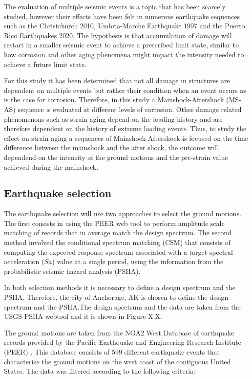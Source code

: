 The evaluation of multiple seismic events is a topic that has been scarcely studied, however their effects have been felt in numerous earthquake sequences such as the Christchurch 2010, Umbria-Marche Earthquake 1997 and the Puerto Rico Earthquakes 2020. The hypothesis is that accumulation of damage will restart in a smaller seismic event to achieve a prescribed limit state, similar to how corrosion and other aging phenomena might impact the intensity needed to achieve a future limit state. 

For this study it has been determined that not all damage in structures are dependent on multiple events but rather their condition when an event occurs as is the case for corrosion. Therefore, in this study a Mainshock-Aftershock (MS-AS) sequence is evaluated at different levels of corrosion. Other damage related phenomenons such as strain aging depend on the loading history and are therefore dependent on the history of extreme loading events. Thus, to study the effect on strain aging a sequences of Mainshock-Aftershock is focused on the time difference between the mainshock and the after shock, the outcome will dependend on the intensity of the ground motions and the pre-strain value achieved during the mainshock.

\subsection{Earthquake selection}

The earthquake selection will use two approaches to select the ground motions. The first consists in using the PEER web tool to perform amplitude scale matching of records that in average match the design spectrum. The second method involved the conditional spectrum matching (CSM) that consists of computing the expected response spectrum associated with a target spectral acceleration ($Sa$) value at a single period, using the information from the probabilistic seismic hazard analysis (PSHA).

In both selection methods it is necessary to define a design spectrum and the PSHA. Therefore, the city of Anchorage, AK is chosen to define the design spectrum and the PSHA.The design spectrum and the data are taken from the USGS PSHA webtool and it is shown in Figure X.X. 

The ground motions are taken from the NGA2 West Database of earthquake records provided by the Pacific Earthquake and Engineering Research Institute (PEER) \cite{Ancheta2014}. This database consists of 599 different earthquake events that characterize the ground motions on the west coast of the contiguous United States. The data was filtered according to the following criteria:

